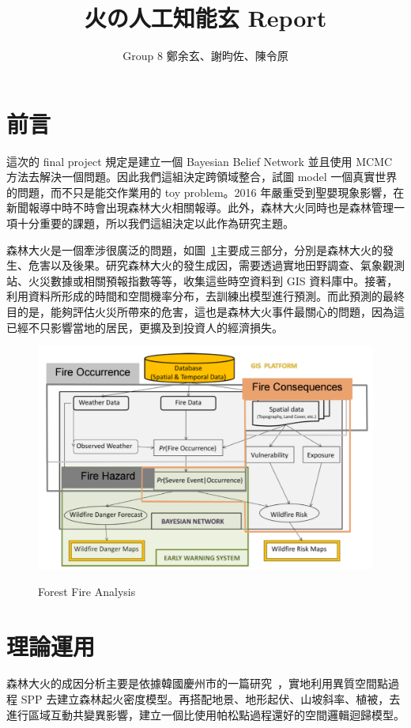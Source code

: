 \documentclass[a4paper]{article}
\title{火の人工知能玄 Report}
\author{Group 8 鄭余玄、謝昀佐、陳令原}
\date{}
\begin{document}
\maketitle
\section{前言}
這次的 final project 規定是建立一個 Bayesian Belief Network 並且使用 MCMC 方法去解決一個問題。因此我們這組決定跨領域整合，試圖 model 一個真實世界的問題，而不只是能交作業用的 toy problem。2016 年嚴重受到聖嬰現象影響，在新聞報導中時不時會出現森林大火相關報導。此外，森林大火同時也是森林管理一項十分重要的課題，所以我們這組決定以此作為研究主題。

森林大火是一個牽涉很廣泛的問題，如圖~\ref{ffp}主要成三部分，分別是森林大火的發生、危害以及後果。研究森林大火的發生成因，需要透過實地田野調查、氣象觀測站、火災數據或相關預報指數等等，收集這些時空資料到 GIS 資料庫中。接著，利用資料所形成的時間和空間機率分布，去訓練出模型進行預測。而此預測的最終目的是，能夠評估火災所帶來的危害，這也是森林大火事件最關心的問題，因為這已經不只影響當地的居民，更擴及到投資人的經濟損失。

\begin{figure}[h]
  \caption{Forest Fire Analysis}
  \centering
  \includegraphics[width=1\textwidth]{problem}
  \label{ffp}
\end{figure}

\section{理論運用}
森林大火的成因分析主要是依據韓國慶州市的一篇研究~\cite{MCFFSK}，實地利用異質空間點過程 SPP 去建立森林起火密度模型。再搭配地景、地形起伏、山坡斜率、植被，去進行區域互動共變異影響，建立一個比使用帕松點過程還好的空間邏輯迴歸模型。
\end{document}
